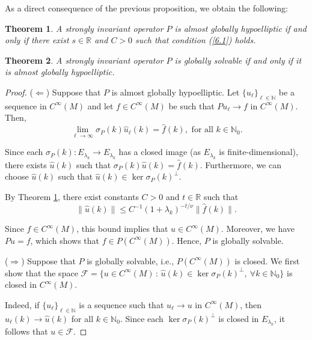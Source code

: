 \documentclass{amsart}
\newtheorem{theorem}{Theorem}[section]
\theoremstyle{definition}
\theoremstyle{remark}
\numberwithin{equation}{section}
\begin{document}
	As a direct consequence of the previous proposition, we obtain the following:
	
	\begin{theorem}\label{agh_est}
		A strongly invariant operator $P$ is almost globally hypoelliptic if and only if there exist $s\in\mathbb{R}$ and $C>0$ such that condition (\ref{6.1}) holds.
	\end{theorem}
	
	\begin{theorem}\label{equiv_gs_agh}
		A strongly invariant operator $P$ is globally solvable if and only if it is almost globally hypoelliptic.
	\end{theorem}
	
	\begin{proof}
		\noindent($\Leftarrow$) Suppose that $P$ is almost globally hypoelliptic.
		Let $\{u_\ell\}_{\ell\in\mathbb{N}}$ be a sequence in $C^\infty(M)$ and let $f\in C^\infty(M)$ be such that $Pu_\ell\to f$ in $C^\infty(M)$. Then,
		\begin{equation*}
			\lim\limits_{\ell\to\infty}\sigma_P(k)\widehat{u}_\ell(k) = \widehat{f}(k), \text{ for all } k\in\mathbb{N}_0.
		\end{equation*}
		
		Since each $\sigma_P(k):E_{\lambda_k}\to E_{\lambda_k}$ has a closed image (as $E_{\lambda_k}$ is finite-dimensional), there exists $\widehat{u}(k)$ such that $\sigma_P(k)\widehat{u}(k)=\widehat{f}(k)$. Furthermore, we can choose $\widehat{u}(k)$ such that $\widehat{u}(k) \in \ker\sigma_P(k)^\perp$.  
		
		By Theorem \ref{agh_est}, there exist constants $C>0$ and $t\in\mathbb{R}$ such that
		\begin{equation*}
			\|\widehat{u}(k)\|\leq C^{-1}(1+\lambda_k)^{-t/\nu}\|\widehat{f}(k)\|.
		\end{equation*}

		Since $f\in C^\infty(M)$, this bound implies that $u\in C^\infty(M)$. Moreover, we have $Pu=f$, which shows that $f\in P(C^\infty(M))$. Hence, $P$ is globally solvable.  
		
		\medskip\noindent
		($\Rightarrow$) Suppose that $P$ is globally solvable, i.e., $P(C^\infty(M))$ is closed.
		We first show that the space $\mathcal{F}=\{u\in C^\infty(M)\,:\, \widehat{u}(k)\in\ker\sigma_P(k)^\perp,\ \forall k\in\mathbb{N}_0\}$	is closed in $C^\infty(M)$. 
		
		Indeed, if $\{u_\ell\}_{\ell\in\mathbb{N}}$ is a sequence such that $u_\ell\to u$ in $C^\infty(M)$, then $\widehat{u}_\ell(k)\to\widehat{u}(k)$ for all $k\in\mathbb{N}_0$. Since each $\ker\sigma_P(k)^\perp$ is closed in $E_{\lambda_k}$, it follows that $u\in\mathcal{F}$.  
		

\end{proof}
\end{document}
